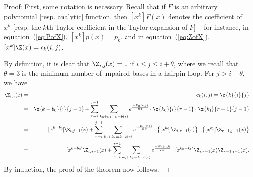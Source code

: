 \noindent
{\sc Proof:}
First, some notation is necessary. Recall that if $F$ is an arbitrary
polynomial [resp. analytic] function, then $[x^k] F(x)$
denotes the coefficient of $x^k$ [resp. the $k$th Taylor coefficient in the
Taylor expansion of $F$] -- for instance, in equation~(\ref{eq:PofX}),
$[x^k]p(x) = p_k$, and in equation~(\ref{eq:ZofX}), $[x^k]\Z(x) = c_k(i,j)$.

By definition, it is clear that $\Z_{i,j}(x)=1$ if $i\leq j \leq i+\theta$,
where we recall that $\theta = 3$ is the minimum number of unpaired bases in
a hairpin loop.  For $j>i+\theta$, we have
\begin{eqnarray*}
[x^k] \Z_{i,j}(x) &=& c_k(i,j) = \z{k}{i}{j}\\
&=&\z{k-b_0}{i}{j-1} + \sum_{r=i}^{j-1} \sum_{k_0+k_1 = k-b(r)}
e^{\frac{-E_0(r,j)}{RT}} \cdot \z{k_0}{i}{r-1} \cdot \z{k_1}{r+1}{j-1} \\
&=&
[x^{k-b_0}] \Z_{i,j-1}(x) +
\sum_{r=i}^{j-1} \sum_{k_0+k_1 = k-b(r)}
e^{\frac{-E_0(r,j)}{RT}} \cdot \left\{ [x^{k_0}] \Z_{i,r-1}(x) \right\} \cdot
\left\{ [x^{k_1}] \Z_{r-1,j-1}(x) \right\} \\
&=&
[x^{k-b_0}] \Z_{i,j-1}(x) +
\sum_{r=i}^{j-1} \sum_{k_0+k_1 = k-b(r)}
e^{\frac{-E_0(r,j)}{RT}} \cdot [x^{k_0+k_1}] \Z_{i,r-1}(x) \Z_{r-1,j-1}(x) .\\
\end{eqnarray*}
By induction, the proof of the theorem now follows. $\Box$
\medskip

